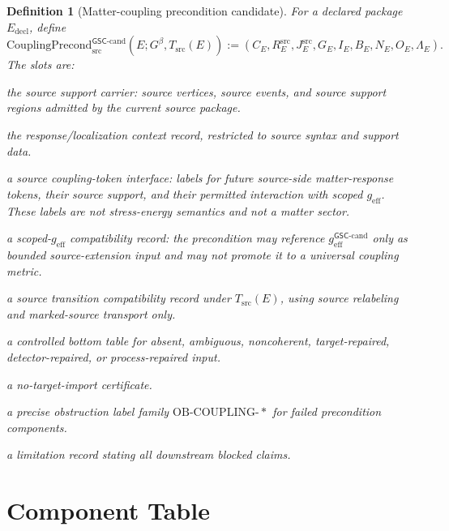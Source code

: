 \documentclass[11pt]{article}
\newcommand{\Gbeta}{G^\beta}
\newcommand{\geff}{g_{\mathrm{eff}}}
\newcommand{\geffCand}{g_{\mathrm{eff}}^{\mathsf{GSC}\mbox{-}\mathrm{cand}}}
\newcommand{\CouplingPrecond}{\mathrm{CouplingPrecond}^{\mathsf{GSC}\mbox{-}\mathrm{cand}}_{\mathrm{src}}}
\newcommand{\OB}{\mathrm{OB}\mbox{-}\mathrm{COUPLING}}
\newtheorem{definition}{Definition}
\begin{document}
\begin{definition}[Matter-coupling precondition candidate]
For a declared package \(E_{\mathrm{decl}}\), define
\[
  \CouplingPrecond(E;\Gbeta,T_{\mathrm{src}}(E)) :=
  (C_E,R^{\mathrm{src}}_E,J^{\mathrm{src}}_E,G_E,I_E,B_E,N_E,O_E,\Lambda_E).
\]
The slots are:
\begin{description}[leftmargin=*]
  \item[\(C_E\)] the source support carrier: source vertices, source events,
  and source support regions admitted by the current source package.
  \item[\(R^{\mathrm{src}}_E\)] the response/localization context record,
  restricted to source syntax and support data.
  \item[\(J^{\mathrm{src}}_E\)] a source coupling-token interface: labels for
  future source-side matter-response tokens, their source support, and their
  permitted interaction with scoped \(\geff\). These labels are not stress-energy
  semantics and not a matter sector.
  \item[\(G_E\)] a scoped-\(\geff\) compatibility record: the precondition may
  reference \(\geffCand\) only as bounded source-extension input and may not
  promote it to a universal coupling metric.
  \item[\(I_E\)] a source transition compatibility record under
  \(T_{\mathrm{src}}(E)\), using source relabeling and marked-source transport
  only.
  \item[\(B_E\)] a controlled bottom table for absent, ambiguous, noncoherent,
  target-repaired, detector-repaired, or process-repaired input.
  \item[\(N_E\)] a no-target-import certificate.
  \item[\(O_E\)] a precise obstruction label family
  \(\OB\text{-}\ast\) for failed precondition components.
  \item[\(\Lambda_E\)] a limitation record stating all downstream blocked
  claims.
\end{description}
\end{definition}

\section{Component Table}
\end{document}

